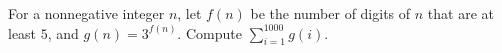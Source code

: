 For a nonnegative integer $n$, let $f(n)$ be the number of digits of $n$ that are at least $5$, and $g(n)=3^{f(n)}$. Compute $\displaystyle\sum_{i=1}^{1000}g(i)$.
